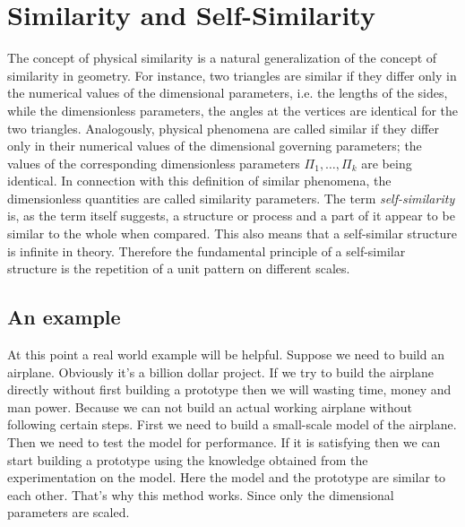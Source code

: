 \section{Similarity and Self-Similarity}

	The concept of physical similarity is a natural generalization of the	concept of similarity in geometry. For instance, two triangles are similar	if they differ only in the numerical values of the dimensional parameters, i.e. the lengths of the sides, while the dimensionless parameters,	the angles at the vertices are identical for the two triangles. Analogously,	physical phenomena are called similar if they differ only in their numerical values of the dimensional governing parameters; the values of the	corresponding dimensionless parameters $\Pi_1, \ldots, \Pi_k$ are being identical.	In connection with this definition of similar phenomena, the dimensionless quantities are called similarity parameters.
	The term \textit{self-similarity} is, as the term itself suggests, a structure or process and a part of it appear to be similar to the whole when compared. This also means that a self-similar structure is infinite in theory. Therefore the fundamental principle of a self-similar structure is the repetition of a unit pattern on different scales. 
	
	
	\subsection{An example}
	At this point a real world example will be helpful. Suppose we need to build an airplane. Obviously it's a billion dollar project. If we try to build the airplane directly without first building a prototype then we will wasting time, money and man power. Because we can not build an actual working airplane without following certain steps. First we need to build a small-scale model of the airplane. Then we need to test the model for performance. If it is satisfying then we can start building a prototype using the knowledge obtained from the experimentation on the model. Here the model and the prototype are similar to each other. That's why this method works. Since only the dimensional parameters are scaled.
	
	

